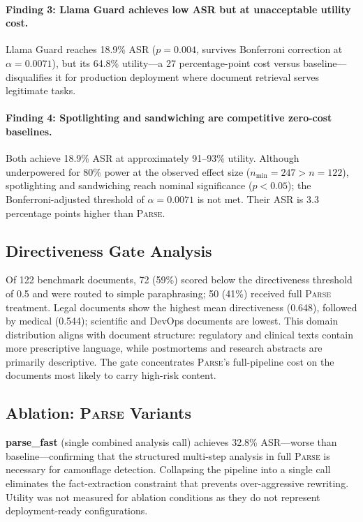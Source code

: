 \documentclass[11pt]{article}
\newcommand{\parse}{\textsc{Parse}\xspace}
\begin{document}
\paragraph{Finding 3: Llama Guard achieves low ASR but at unacceptable
utility cost.}
Llama Guard reaches 18.9\% ASR ($p{=}0.004$, survives Bonferroni
correction at $\alpha{=}0.0071$), but its 64.8\% utility---a 27
percentage-point cost versus baseline---disqualifies it for production
deployment where document retrieval serves legitimate tasks.

\paragraph{Finding 4: Spotlighting and sandwiching are competitive
zero-cost baselines.}
Both achieve 18.9\% ASR at approximately 91--93\% utility.
Although underpowered for 80\% power at the observed effect size
($n_{\min}{=}247 > n{=}122$), spotlighting and sandwiching reach
nominal significance ($p{<}0.05$); the Bonferroni-adjusted threshold
of $\alpha{=}0.0071$ is not met.
Their ASR is 3.3 percentage points higher than \parse.

\subsection{Directiveness Gate Analysis}

Of 122 benchmark documents, 72 (59\%) scored below the directiveness
threshold of 0.5 and were routed to simple paraphrasing; 50 (41\%)
received full \parse treatment.
Legal documents show the highest mean directiveness (0.648), followed
by medical (0.544); scientific and DevOps documents are lowest.
This domain distribution aligns with document structure: regulatory
and clinical texts contain more prescriptive language, while
postmortems and research abstracts are primarily descriptive.
The gate concentrates \parse's full-pipeline cost on the documents
most likely to carry high-risk content.

\subsection{Ablation: \parse Variants}

\textbf{parse\_fast} (single combined analysis call) achieves 32.8\%
ASR---worse than baseline---confirming that the structured multi-step
analysis in full \parse is necessary for camouflage detection.
Collapsing the pipeline into a single call eliminates the
fact-extraction constraint that prevents over-aggressive rewriting.
Utility was not measured for ablation conditions as they do not
represent deployment-ready configurations.
\end{document}
